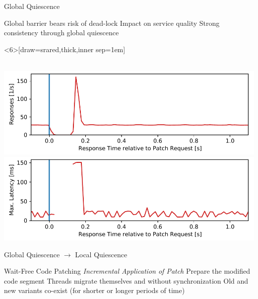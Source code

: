 \RequirePackage{luatex85}\documentclass[beamer,xcolor={table,rgb,dvipsnames}]{beamer}
\begin{document}
\begin{frame}{Global Quiescence}
  \begin{center}
    \bigskip


    \bigskip
    \bi
     Global barrier bears risk of dead-lock
     Impact on service quality
     Strong consistency through global quiescence
    \ei
  \end{center}
  \begin{btModal}<6>[draw=srared,thick,inner sep=1em]
    \begin{minipage}{0.8\linewidth}
      \begin{center}
        {\Large{}} \\[2ex]

      \includegraphics[width=0.6\pagewidth]{fig/request-1}\\[1ex]
      \includegraphics[width=0.6\pagewidth]{fig/request-2}
    \end{center}
    \end{minipage}
  \end{btModal}
\end{frame}


\begin{frame}{Global Quiescence $\rightarrow$ Local Quiescence}
  \begin{center}
  \end{center}


  \begin{btBlock}{Wait-Free Code Patching \hfill \emph{Incremental Application of Patch}}
    \bi
    \ii Prepare the modified code segment
    \ii Threads migrate themselves and without synchronization
    \ii Old and new variants co-exist (for shorter or longer periods of time)
    \ei
  \end{btBlock}


\end{frame}
\end{document}
